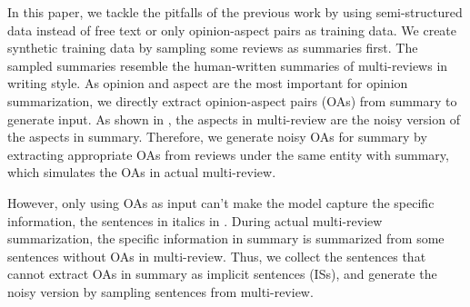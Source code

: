 In this paper, we tackle the pitfalls of the previous
work by using semi-structured data instead of free text 
or only opinion-aspect pairs as training data. 
We create synthetic training data by 
sampling some reviews as summaries first.
The sampled summaries resemble 
the human-written summaries of multi-reviews in writing style.
As opinion and aspect are the most important for opinion summarization,
we directly extract opinion-aspect pairs (OAs) from summary
to generate input.
As shown in ,
the aspects in multi-review are the noisy version of the aspects in summary.
Therefore, we generate noisy OAs for summary by
extracting appropriate OAs from reviews under the 
same entity with summary,
which simulates the OAs in actual multi-review.



However, 
only using OAs as input can't make the model capture the specific information,
the sentences in italics in .
During actual multi-review summarization,
the specific information in summary
is summarized from some sentences without OAs in multi-review.
Thus, we collect the sentences that cannot extract OAs in summary as implicit sentences (ISs),
and generate the noisy version by sampling sentences from 
multi-review. 





